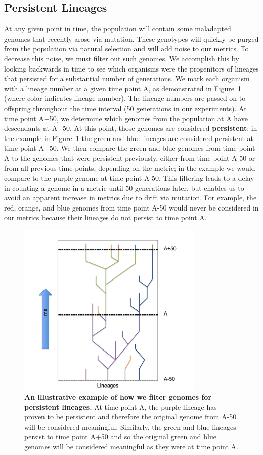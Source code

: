 \documentclass[letterpaper]{article}
\begin{document}
\subsection{Persistent Lineages}
    At any given point in time, the population will contain some maladapted genomes that recently arose via mutation. These genotypes will quickly be purged from the population via natural selection and will add noise to our metrics. To decrease this noise, we must filter out such genomes. We accomplish this by looking backwards in time to see which organisms were the progenitors of lineages that persisted for a substantial number of generations. We mark each organism with a lineage number at a given time point A, as demonstrated in Figure~\ref{lineages} (where color indicates lineage number). The lineage numbers are passed on to offspring throughout the time interval (50 generations in our experiments). At time point A+50, we determine which genomes from the population at A have descendants at A+50. At this point, those genomes are considered \textbf{persistent}; in the example in Figure~\ref{lineages} the green and blue lineages are considered persistent at time point A+50. We then compare the green and blue genomes from time point A to the genomes that were persistent previously, either from time point A-50 or from all previous time points, depending on the metric; in the example we would compare to the purple genome at time point A-50. This filtering leads to a delay in counting a genome in a metric until 50 generations later, but enables us to avoid an apparent increase in metrics due to drift via mutation. For example, the red, orange, and blue genomes from time point A-50 would never be considered in our metrics because their lineages do not persist to time point A.

\begin{figure}
\includegraphics[width=3.5in]{figs/LineageFigure.png}
\caption{\textbf{An illustrative example of how we filter genomes for persistent lineages.} At time point A, the purple lineage has proven to be persistent and therefore the original genome from A-50 will be considered meaningful. Similarly, the green and blue lineages persist to time point A+50 and so the original green and blue genomes will be considered meaningful as they were at time point A.}
\label{lineages}
\end{figure}
\end{document}
